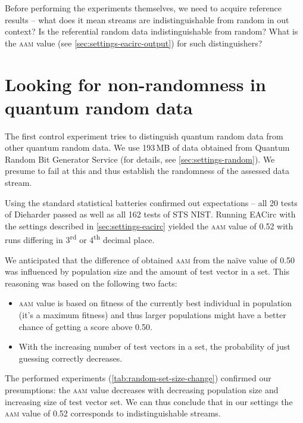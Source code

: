 \documentclass[12pt,twoside]{fithesis2}		%
\renewcommand{\_}{\leavevmode \kern0.0em\vbox{\hrule width0.4em}}
\newcommand{\squarebullet}{\textcolor{black}{\raisebox{0.15em}{\rule{4pt}{4pt}}}}
\newenvironment{myItemize}{
  \begin{itemize}[leftmargin=2em,rightmargin=1em,itemsep=\parskip ,parsep=0em,topsep=0em,partopsep=0em]
  \renewcommand{\labelitemi}{\squarebullet}
  \renewcommand{\labelitemii}{$\diamond$}
}{
  \end{itemize}
}
\begin{document}
Before performing the experiments themselves, we need to acquire reference results -- what does it mean
streams are indistinguishable from random in out context? Is the referential random data indistinguishable from random?
What is the \textsc{aam} value (see \autoref{sec:settings-eacirc-output}) for such distinguishers?

\section{Looking for non-randomness in quantum random data}
\label{sec:control-random-random}

The first control experiment tries to distinguish quantum random data from other quantum random data.
We use 193\,MB of data obtained from Quantum Random Bit Generator Service (for details, see \autoref{sec:settings-random}).
We presume to fail at this and thus establish the randomness of the assessed data stream.

Using the standard statistical batteries confirmed out expectations -- all 20 tests of Dieharder passed as well as
all 162 tests of STS NIST. Running EACirc with the settings described in \autoref{sec:settings-eacirc}
yielded the \textsc{aam} value of 0.52 with runs differing in 3\textsuperscript{rd}
or 4\textsuperscript{th} decimal place.

We anticipated that the difference of obtained \textsc{aam} from the naïve value of 0.50 was influenced by population size
and the amount of test vector in a set. This reasoning was based on the following two facts:
\begin{myItemize}
\item \textsc{aam} value is based on fitness of the currently best individual in population (it's a maximum fitness) and thus
larger populations might have a better chance of getting a score above 0.50.
\item With the increasing number of test vectors in a set, the probability of just guessing correctly decreases.
\end{myItemize}

\noindent
The performed experiments (\autoref{tab:random-set-size-change}) confirmed our presumptions: the \textsc{aam} value decreases
with decreasing population size and increasing size of test vector set. We can thus conclude that in our settings the \textsc{aam}
value of 0.52 corresponds to indistinguishable streams.
\end{document}
